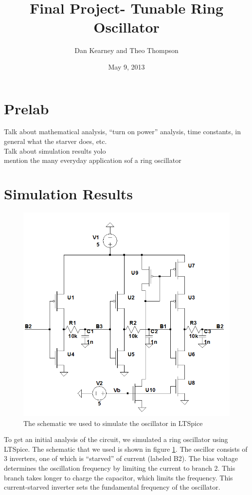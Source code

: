 \documentclass{article}
\title{Final Project- Tunable Ring Oscillator}
\author{Dan Kearney and Theo Thompson}
\date{May 9, 2013}
\begin{document}
\maketitle

\section*{Prelab}
Talk about mathematical analysis, ``turn on power'' analysis, time constants, in general what the starver does, etc.\\
Talk about simulation results yolo\\
mention the many everyday application sof a ring oscillator

\section*{Simulation Results}

\begin{figure}[H]
\centering
\includegraphics[scale=.5]{finalSchem2.png}
\caption{The schematic we used to simulate the oscillator in LTSpice}
\label{schem}
\end{figure}

To get an initial analysis of the circuit, we simulated a ring oscillator using LTSpice. The schematic that we used is shown in figure \ref{schem}. The oscillor consists of 3 inverters, one of which is ``starved'' of current (labeled B2). The bias voltage determines the oscillation frequency by limiting the current to branch 2. This branch takes longer to charge the capacitor, which limits the frequency. This current-starved inverter sets the fundamental frequency of the oscillator. \\
\end{document}
